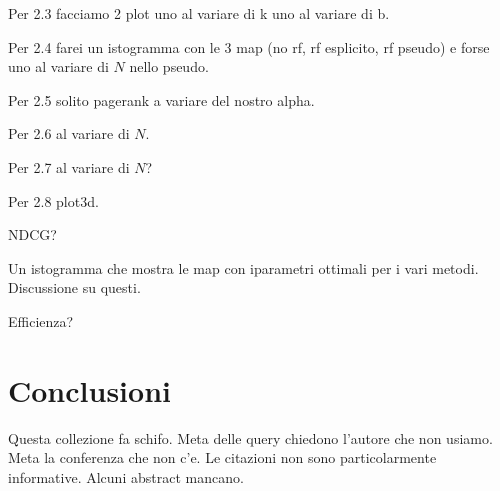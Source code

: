 \documentclass{llncs}
\begin{document}
Per 2.3 facciamo 2 plot uno al variare di k uno al variare di b.

Per 2.4 farei un istogramma con le 3 map (no rf, rf esplicito, rf pseudo) e forse uno al variare di $N$ nello pseudo.

Per 2.5 solito pagerank a variare del nostro alpha.

Per 2.6 al variare di $N$.

Per 2.7 al variare di $N$?

Per 2.8 plot3d.

NDCG?

Un istogramma che mostra le map con iparametri ottimali per i vari metodi. Discussione su questi.

Efficienza?

%
%
%

\section{Conclusioni}
\label{sec:conclusioni}

Questa collezione fa schifo. Meta delle query chiedono l'autore che non usiamo. Meta la conferenza che non c'e.
Le citazioni non sono particolarmente informative. Alcuni abstract mancano. 


\end{document}
